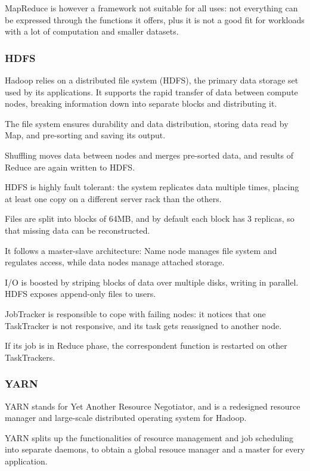 MapReduce is however a framework not suitable for all uses: not everything can be expressed through the functions it offers, plus it is not a good fit for workloads with a lot of computation and smaller datasets.

\subsubsection{HDFS}
Hadoop relies on a distributed file system (HDFS), the primary data storage set used by its applications. It supports the rapid transfer of data between compute nodes, breaking information down into separate blocks and distributing it.

The file system ensures durability and data distribution, storing data read by Map, and pre-sorting and saving its output. 

Shuffling moves data between nodes and merges pre-sorted data, and results of Reduce are again written to HDFS.

HDFS is highly fault tolerant: the system replicates data multiple times, placing at least one copy on a different server rack than the others.

Files are split into blocks of 64MB, and by default each block has 3 replicas, so that missing data can be reconstructed. 

It follows a master-slave architecture: Name node manages file system and regulates access, while data nodes manage attached storage.

I/O is boosted by striping blocks of data over multiple disks, writing in parallel. HDFS exposes append-only files to users.

JobTracker is responsible to cope with failing nodes: it notices that one TaskTracker is not responsive, and its task gets reassigned to another node.

If its job is in Reduce phase, the correspondent function is restarted on other TaskTrackers.

\subsubsection{YARN}
YARN stands for Yet Another Resource Negotiator, and is a redesigned resource manager and large-scale distributed operating system for Hadoop.

YARN splits up the functionalities of resource management and job scheduling into separate daemons, to obtain a global resouce manager and a master for every application.

